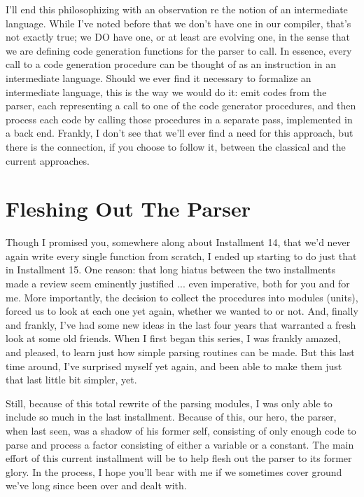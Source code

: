 I'll end this philosophizing with an observation re the notion of an intermediate language. While I've noted before that we don't have one in our compiler, that's not exactly true; we  DO  have one, or at least are evolving one, in the sense that we are defining code generation functions for the parser to call. In essence, every call to a code generation procedure can be thought of as an instruction in an intermediate language. Should we ever find it necessary to formalize an intermediate language, this is the way we would do it:  emit codes from the parser, each representing a call to one of the code generator procedures, and then process each code by calling those procedures in a separate pass, implemented in a back end. Frankly, I don't see that we'll ever find a need for this approach, but there is the connection, if you choose to follow it, between the classical and the current approaches.

\section{Fleshing Out The Parser}

Though I promised you, somewhere along about Installment 14, that we'd never again write every single function from scratch, I ended up starting to do just that in Installment 15. One reason: that long hiatus between the two installments made a review seem eminently justified ... even imperative, both for you and for me. More importantly, the decision to collect the procedures into modules (units), forced us to look at each one yet again, whether we wanted to or not. And, finally and frankly, I've had some new ideas in the last four years that warranted a fresh look at some old friends. When I first began this series, I was frankly amazed, and pleased, to learn just how simple parsing routines can be made. But this last time around, I've surprised myself yet again, and been able to make them just that last little bit simpler, yet.

Still, because of this total rewrite of the parsing modules, I was only able to include so much in the last installment. Because of this, our hero, the parser, when last seen, was a shadow of his former self, consisting of only enough code to parse and process a factor consisting of either a variable or a constant. The main effort of this current installment will be to help flesh out the parser to its former glory. In the process, I hope you'll bear with me if we sometimes cover ground we've long since been over and dealt with.

